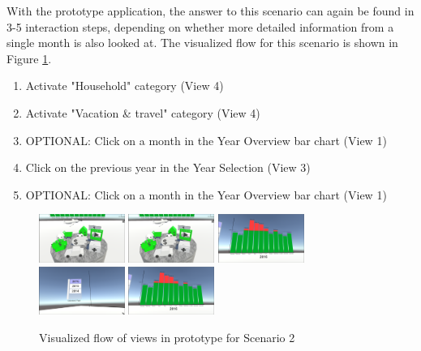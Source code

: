 With the prototype application, the answer to this scenario can again be found in 3-5 interaction steps, depending on whether more detailed information from a single month is also looked at. The visualized flow for this scenario is shown in Figure \ref{fig:scenariotwoprototype}.
\begin{enumerate}
	\item Activate "Household" category (View 4)
	\item Activate "Vacation \& travel" category (View 4)
	\item OPTIONAL: Click on a month in the Year Overview bar chart (View 1)
	\item Click on the previous year in the Year Selection (View 3)
	\item OPTIONAL: Click on a month in the Year Overview bar chart (View 1)
\end{enumerate}
\begin{figure}[h]
	\begin{center}
		\includegraphics[width=2.8cm]{03_Figures/08_Development/View4_CategoriesFiltering.png}
		\includegraphics[width=2.8cm]{03_Figures/08_Development/View4_CategoriesFiltering.png}
		\includegraphics[width=2.8cm]{03_Figures/08_Development/View1_YearOverview.png}
		\includegraphics[width=2.8cm]{03_Figures/08_Development/View3_YearSelection.png}
		\includegraphics[width=2.8cm]{03_Figures/08_Development/View1_YearOverview.png}
		\caption{Visualized flow of views in prototype for Scenario 2}
		\label{fig:scenariotwoprototype}
	\end{center}
\end{figure}

